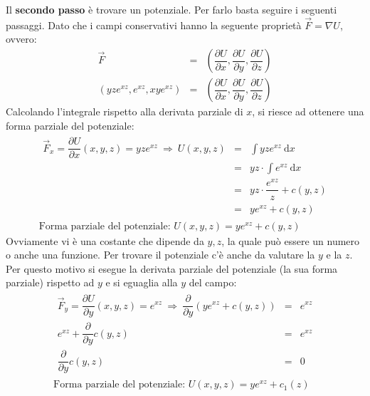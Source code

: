 \documentclass[a4paper]{article}
\begin{document}
	\noindent
	Il \textbf{secondo passo} è trovare un potenziale. Per farlo basta seguire i seguenti passaggi. Dato che i campi conservativi hanno la seguente proprietà $\overset{\rightarrow}{F} = \nabla U$, ovvero:
	\begin{equation*}
		\begin{array}{rcl}
			\overset{\rightarrow}{F} &=& \left(\dfrac{\partial U}{\partial x}, \dfrac{\partial U}{\partial y}, \dfrac{\partial U}{\partial z}\right) \\ [1em]
			\left(yze^{xz}, e^{xz}, xye^{xz}\right) &=& \left(\dfrac{\partial U}{\partial x}, \dfrac{\partial U}{\partial y}, \dfrac{\partial U}{\partial z}\right)
		\end{array}
	\end{equation*}
	Calcolando l'integrale rispetto alla derivata parziale di $x$, si riesce ad ottenere una forma parziale del potenziale:
	\begin{gather*}
		\begin{array}{rcl}
			\overset{\rightarrow}{F}_{x} = \dfrac{\partial U}{\partial x}\left(x,y,z\right) = yze^{xz} \: \Longrightarrow \: U\left(x,y,z\right) 
			&=&
			\displaystyle\int yze^{xz} \:\mathrm{d}x \\ [1em]
			&=&
			yz \cdot \displaystyle\int e^{xz} \:\mathrm{d}x \\ [1em]
			&=&
			yz \cdot \dfrac{e^{xz}}{z} + c\left(y,z\right) \\ [1em]
			&=&
			ye^{xz} + c\left(y,z\right)
		\end{array}
		\\
		\text{Forma parziale del potenziale: } U\left(x,y,z\right) = ye^{xz} + c\left(y,z\right)
	\end{gather*}
	Ovviamente vi è una costante che dipende da $y,z$, la quale può essere un numero o anche una funzione. Per trovare il potenziale c'è anche da valutare la $y$ e la $z$. Per questo motivo si esegue la derivata parziale del potenziale (la sua forma parziale) rispetto ad $y$ e si eguaglia alla $y$ del campo:
	\begin{gather*}
		\begin{array}{rcl}
			\overset{\rightarrow}{F}_{y} = \dfrac{\partial U}{\partial y}\left(x,y,z\right) = e^{xz} \: \Longrightarrow \: \dfrac{\partial }{\partial y}\left(ye^{xz} + c\left(y,z\right)\right)
			&=&
			e^{xz} \\ [1em]
			e^{xz} + \dfrac{\partial}{\partial y}c\left(y,z\right)
			&=&
			e^{xz} \\ [1em]
			\dfrac{\partial}{\partial y}c\left(y,z\right)
			&=&
			0
		\end{array}
		\\
		\text{Forma parziale del potenziale: } U\left(x,y,z\right) = ye^{xz} + c_{1}\left(z\right)
	\end{gather*}
\end{document}
